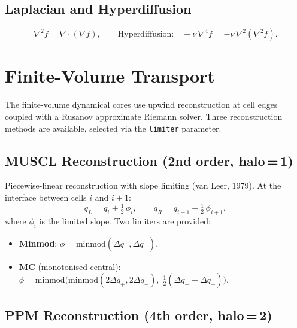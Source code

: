 \documentclass[11pt,a4paper]{article}
\newcommand{\half}{\tfrac{1}{2}}
\begin{document}
\subsection{Laplacian and Hyperdiffusion}
\begin{equation}
  \nabla^2 f = \nabla\!\cdot\!(\nabla f),
  \qquad \text{Hyperdiffusion:}\quad -\nu\,\nabla^4 f = -\nu\,\nabla^2(\nabla^2 f).
\end{equation}

\section{Finite-Volume Transport}

The finite-volume dynamical cores use upwind reconstruction at cell edges coupled with a Rusanov approximate Riemann solver.  Three reconstruction methods are available, selected via the \texttt{limiter} parameter.

\subsection{MUSCL Reconstruction (2nd order, halo\,=\,1)}

Piecewise-linear reconstruction with slope limiting (van Leer, 1979).  At the interface between cells $i$ and $i\!+\!1$:
\begin{equation}
  q_L = q_i + \half\,\phi_i, \qquad q_R = q_{i+1} - \half\,\phi_{i+1},
\end{equation}
where $\phi_i$ is the limited slope.  Two limiters are provided:
\begin{itemize}[nosep]
  \item \textbf{Minmod}: $\phi=\mathrm{minmod}(\Delta q_{+},\Delta q_{-})$,
  \item \textbf{MC} (monotonised central): $\phi=\mathrm{minmod}\bigl(\mathrm{minmod}(2\Delta q_{+},2\Delta q_{-}),\;\half(\Delta q_{+}+\Delta q_{-})\bigr)$.
\end{itemize}

\subsection{PPM Reconstruction (4th order, halo\,=\,2)}
\end{document}

